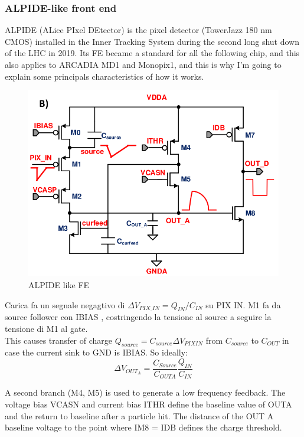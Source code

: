 \begin{titlepage}
\subsubsection{ALPIDE-like front end}
ALPIDE (ALice PIxel DEtector) is the pixel detector (TowerJazz 180 nm CMOS) installed in the 
Inner Tracking System during the second long shut down of the LHC in 2019. Its FE became a
standard for all the following chip, and this also applies to ARCADIA MD1 and Monopix1, and this 
is why I'm going to explain some principals characteristics of how it works. 
\begin{figure}[h!]
   \centering
   \includegraphics[width=.7\linewidth]{figures/ALPIDE_FE.png}
   \caption{ALPIDE like FE}
   \label{fig:ALPIDE-like}
\end{figure}
Carica fa un segnale negagtivo di $\Delta V_{PIX\_IN} = Q_{IN}/C_{IN}$ su PIX IN. 
M1 fa da source follower con IBIAS , costringendo la tensione al source a seguire la tensione di M1
al gate. \\
This causes transfer of charge 
$Q_{source}=C_{source}\Delta V_{PIXIN}$ from $C_{source}$ to $C_{OUT}$ in case the current sink
to GND is IBIAS.
So ideally:
\begin{equation}
   \Delta V_{OUT_A} = \frac{C_{Source}}{C_{OUTA}}\frac{Q_{IN}}{C_{IN}}
\end{equation}

A second branch (M4, M5) is used to generate a low frequency feedback. 
The voltage bias
VCASN and current bias ITHR define the baseline value of OUTA and the return to baseline after
a particle hit. The distance of the OUT A baseline voltage to the point where
IM8 = IDB defines the charge threshold.
  

\end{titlepage}
